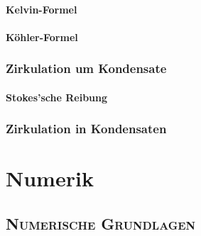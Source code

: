 \documentclass{book}
\begin{document}
\subsection{Kelvin-Formel}
\label{sec:kelvin-formal}

\subsection{Köhler-Formel}
\label{sec:köhler-formel}

\section{Zirkulation um Kondensate}
\label{sec:zirkulation_um_kondensate}

\subsection{Stokes'sche Reibung}
\label{sec:stokes'sche_reibung}

\section{Zirkulation in Kondensaten}
\label{sec:zirkulation_in_kondensaten}

\part{Numerik}
\label{part:numerik}

\chapter{\normalfont\textsc{Numerische Grundlagen}}
\label{chap:numerische_grundlagen}
\end{document}
